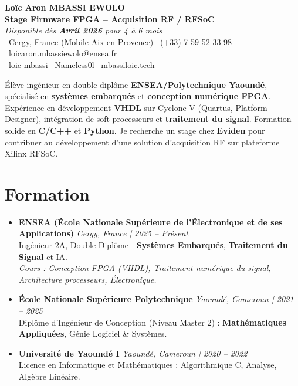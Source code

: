 \documentclass[a4paper,11pt]{article}
\begin{document}
\begin{center}
    {\Large \textbf{Loïc Aron MBASSI EWOLO}} \\ \vspace{4pt}
    \textbf{\large Stage Firmware FPGA -- Acquisition RF / RFSoC} \\
    \textit{\small Disponible dès \textbf{Avril 2026} pour 4 à 6 mois}\\
    \vspace{4pt}
    \small
    \faMapMarker\ Cergy, France (Mobile Aix-en-Provence) \quad
    \faPhone\ (+33) 7 59 52 33 98 \quad
    \faEnvelope\ loicaron.mbassiewolo@ensea.fr \\ \vspace{2pt}
    \faLinkedin\ loic-mbassi \quad
    \faGithub\ Nameless0l \quad
    \faGlobe\ mbassiloic.tech
\end{center}

\vspace{-6pt}

\noindent\small{Élève-ingénieur en double diplôme \textbf{ENSEA/Polytechnique Yaoundé}, spécialisé en \textbf{systèmes embarqués} et \textbf{conception numérique FPGA}. Expérience en développement \textbf{VHDL} sur Cyclone V (Quartus, Platform Designer), intégration de soft-processeurs et \textbf{traitement du signal}. Formation solide en \textbf{C/C++} et \textbf{Python}. Je recherche un stage chez \textbf{Eviden} pour contribuer au développement d'une solution d'acquisition RF sur plateforme Xilinx RFSoC.}

\section{Formation}
\begin{itemize}[leftmargin=*, label={.}, nosep]
    \item \textbf{ENSEA (École Nationale Supérieure de l'Électronique et de ses Applications)} \hfill \textit{Cergy, France | 2025 -- Présent} \\
    \small{Ingénieur 2A, Double Diplôme - \textbf{Systèmes Embarqués}, \textbf{Traitement du Signal} et IA.} \\
    \textit{\small{Cours : Conception FPGA (VHDL), Traitement numérique du signal, Architecture processeurs, Électronique.}}
    \vspace{2pt}
    \item \textbf{École Nationale Supérieure Polytechnique} \hfill \textit{Yaoundé, Cameroun | 2021 -- 2025} \\
    \small{Diplôme d'Ingénieur de Conception (Niveau Master 2) : \textbf{Mathématiques Appliquées}, Génie Logiciel \& Systèmes.}
    \item \textbf{Université de Yaoundé I} \hfill \textit{Yaoundé, Cameroun | 2020 -- 2022} \\
    \small{Licence en Informatique et Mathématiques : Algorithmique C, Analyse, Algèbre Linéaire.}
\end{itemize}
\end{document}
